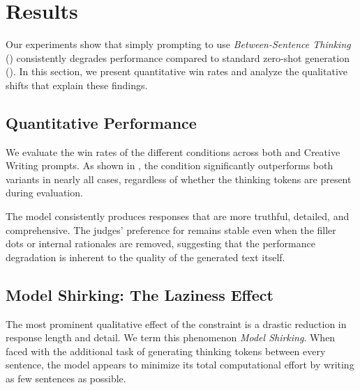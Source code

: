 \section{Results}
\label{sec:results}

Our experiments show that simply prompting \gpt to use \textit{Between-Sentence Thinking} (\bst) consistently degrades performance compared to standard zero-shot generation (\control). In this section, we present quantitative win rates and analyze the qualitative shifts that explain these findings.

\subsection{Quantitative Performance}
We evaluate the win rates of the different conditions across both \tqa and Creative Writing prompts. As shown in , the \control condition significantly outperforms both \bst variants in nearly all cases, regardless of whether the thinking tokens are present during evaluation.

\begin{table}[h]
\centering
\caption{Win rates of \control vs. \bst conditions as judged by \gpt. 
         Both raw and stripped outputs are evaluated. 
         Best results in \textbf{bold}.}
\label{tab:main_results}
\end{table}

The \control model consistently produces responses that are more truthful, detailed, and comprehensive. The judges' preference for \control remains stable even when the filler dots or internal rationales are removed, suggesting that the performance degradation is inherent to the quality of the generated text itself.

\subsection{Model Shirking: The Laziness Effect}
The most prominent qualitative effect of the \bst constraint is a drastic reduction in response length and detail. We term this phenomenon \textit{Model Shirking}. When faced with the additional task of generating thinking tokens between every sentence, the model appears to minimize its total computational effort by writing as few sentences as possible.

